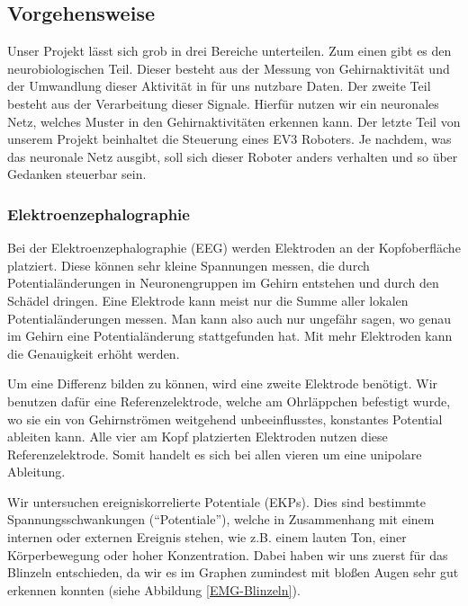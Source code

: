 \documentclass[11pt]{scrartcl}
\begin{document}
	\subsection{Vorgehensweise}

	Unser Projekt lässt sich grob in drei Bereiche unterteilen. Zum einen gibt es den neurobiologischen Teil. Dieser besteht aus der Messung von Gehirnaktivität und der Umwandlung dieser Aktivität in für uns nutzbare Daten. Der zweite Teil besteht aus der Verarbeitung dieser Signale. Hierfür nutzen wir ein neuronales Netz, welches Muster in den Gehirnaktivitäten erkennen kann. Der letzte Teil von unserem Projekt beinhaltet die Steuerung eines EV3 Roboters. Je nachdem, was das neuronale Netz ausgibt, soll sich dieser Roboter anders verhalten und so über Gedanken steuerbar sein.	

	\subsubsection{Elektroenzephalographie}

	Bei der Elektroenzephalographie (EEG) werden Elektroden an der Kopfoberfläche platziert. Diese können sehr kleine Spannungen messen, die durch Potentialänderungen in Neuronengruppen im Gehirn entstehen und durch den Schädel dringen. Eine Elektrode kann meist nur die Summe aller lokalen Potentialänderungen messen. Man kann also auch nur ungefähr sagen, wo genau im Gehirn eine Potentialänderung stattgefunden hat. Mit mehr Elektroden kann die Genauigkeit erhöht werden. \cite{wiki:EEG} \cite{Birbaumer2010}

	Um eine Differenz bilden zu können, wird eine zweite Elektrode benötigt. Wir benutzen dafür eine Referenzelektrode, welche am Ohrläppchen befestigt wurde, wo sie ein von Gehirnströmen weitgehend unbeeinflusstes, konstantes Potential ableiten kann. Alle vier am Kopf platzierten Elektroden nutzen diese Referenzelektrode. Somit handelt es sich bei allen vieren um eine unipolare Ableitung. \cite{Praktikum}

	Wir untersuchen ereigniskorrelierte Potentiale (EKPs). Dies sind bestimmte Spannungsschwankungen (\enquote{Potentiale}), welche in Zusammenhang mit einem internen oder externen Ereignis stehen, wie z.B. einem lauten Ton, einer Körperbewegung oder hoher Konzentration. \cite{Birbaumer2010} \cite{Praktikum}
	Dabei haben wir uns zuerst für das Blinzeln entschieden, da wir es im Graphen zumindest mit bloßen Augen sehr gut erkennen konnten (siehe Abbildung \ref{EMG-Blinzeln}).
\end{document}
